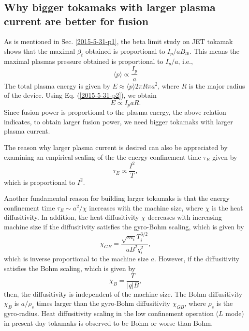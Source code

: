\documentclass{llncs}
\begin{document}
\

\subsection{Why bigger tokamaks with larger plasma current are better for
fusion}

As is mentioned in Sec. \ref{2015-5-31-p1}, the beta limit study on JET
tokamak shows that the maximal $\beta_t$ obtained is proportional to $I_p / a
B_{t 0}$. This means the maximal plasmas pressure obtained is proportional to
$I_p / a$, i.e.,
\begin{equation}
  \label{2015-5-31-p2} \langle p \rangle \propto \frac{I_p}{a}
\end{equation}
The total plasma energy is given by $E \approx \langle p \rangle 2 \pi R \pi
a^2$, where $R$ is the major radius of the device. Using Eq.
(\ref{2015-5-31-p2}), we obtain
\begin{equation}
  E \propto I_p a R.
\end{equation}
Since fusion power is proportional to the plasma energy, the above relation
indicates, to obtain larger fusion power, we need bigger tokamaks with larger
plasma current.

The reason why larger plasma current is desired can also be appreciated by
examining an empirical scaling of the the energy confinement time $\tau_E$
given by
\begin{equation}
  \tau_E \propto \frac{I^2}{T},
\end{equation}
which is proportional to $I^2$.

Another fundamental reason for building larger tokamaks is that the energy
confinement time $\tau_E \sim a^2 / \chi$ increases with the machine size,
where $\chi$ is the heat diffusitivity. In addition, the heat diffusitivity
$\chi$ decreases with increasing machine size if the diffusitivity satisfies
the gyro-Bohm scaling, which is given by
\begin{equation}
  \chi_{G B} = \frac{\sqrt{m_i} T_i^{3 / 2}}{a B^2 q^2_i},
\end{equation}
which is inverse proportional to the machine size $a$. However, if the
diffusitivity satisfies the Bohm scaling, which is given by
\begin{equation}
  \chi_B = \frac{T}{| q | B},
\end{equation}
then, the diffusitivity is independent of the machine size. The Bohm
diffusitivity $\chi_B$ is $a / \rho_s$ times larger than the gyro-Bohm
diffusitivity $\chi_{G B}$, where $\rho_s$ is the gyro-radius. Heat
diffusitivity scaling in the low confinement operation ($L$ mode) in
present-day tokamaks is observed to be Bohm or worse than Bohm.
\end{document}
